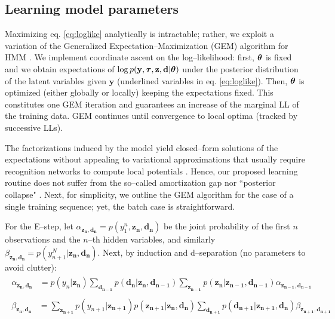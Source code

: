 \documentclass[runningheads]{llncs}
\begin{document}
\subsection{Learning model parameters}
Maximizing eq. \eqref{eq:loglike} analytically is intractable; rather, we exploit a variation of the Generalized Expectation--Maximization (GEM) algorithm for HMM \cite{rabiner1989tutorial}. We implement coordinate ascent on the log--likelihood: first, $\text{\boldmath$\theta$\unboldmath}$ is fixed and we obtain expectations of $\log{p(\mathbf{y}, \text{\boldmath$\tau$\unboldmath}, \mathbf{z}, \mathbf{d}| \text{\boldmath$\theta$\unboldmath})}$ under the posterior distribution of the latent variables given $\mathbf{y}$ (underlined variables in eq. \eqref{eq:loglike}). Then, $\text{\boldmath$\theta$\unboldmath}$ is optimized (either globally or locally) keeping the expectations fixed. This constitutes one GEM iteration and guarantees an increase of the marginal LL of the training data. GEM continues until convergence to local optima (tracked by successive LLs).

The factorizations induced by the model yield closed--form solutions of the expectations without appealing to variational approximations that usually require recognition networks to compute local potentials \cite{kingma2013auto,johnson2016composing,ebbers2017hidden,krishnan2017structured,dong2020collapsed}. Hence, our proposed learning routine does not suffer from the so--called amortization gap \cite{cremer2018inference} nor ``posterior collapse" \cite{he2019lagging,dieng2019avoiding}. Next, for simplicity, we outline the GEM algorithm for the case of a single training sequence; yet, the batch case is straightforward.

For the E--step, let $\alpha_{\mathbf{z_n}, \mathbf{d_n}} = p(y_1^n, \mathbf{z_n}, \mathbf{d_n})$ be the joint probability of the first $n$ observations and the $n$--th hidden variables, and similarly $\beta_{\mathbf{z_n}, \mathbf{d_n}} = p(y_{n+1}^N| \mathbf{z_n}, \mathbf{d_n})$. Next, by induction and d--separation \cite{koller2009probabilistic} (no parameters to avoid clutter):
\begin{align}
	\begin{split}\label{eq:alpha}
		\alpha_{\mathbf{z_n}, \mathbf{d_n}} &=  p(y_n|\mathbf{z_n}) \sum_{\mathbf{d_{n-1}}} p(\mathbf{d_n}|\mathbf{z_n},\mathbf{d_{n-1}}) 
		\sum_{\mathbf{z_{n-1}}}  p(\mathbf{z_n}|\mathbf{z_{n-1}},\mathbf{d_{n-1}}) \alpha_{\mathbf{z_{n-1}}, \mathbf{d_{n-1}}} 
	\end{split}\\
	\begin{split}\label{eq:beta}
		\beta_{\mathbf{z_n}, \mathbf{d_n}} &=  \sum_{\mathbf{z_{n+1}}} p(y_{n+1}|\mathbf{z_{n+1}})  p(\mathbf{z_{n+1}}| \mathbf{z_{n}}, \mathbf{d_{n}})  
		\sum_{ \mathbf{d_{n+1}}} p(\mathbf{d_{n+1}}|\mathbf{z_{n+1}}, \mathbf{d_{n}})  \beta_{\mathbf{z_{n+1}}, \mathbf{d_{n+1}}} 
	\end{split}
\end{align}
\end{document}
